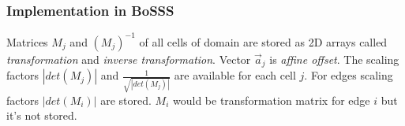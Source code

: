 \documentclass[BoSSSForSolvingConservationLaws.tex]{subfiles}
\begin{document}
\subsubsection*{Implementation in BoSSS}
Matrices $M_j$ and $(M_j)^{-1}$ of all cells of domain are stored as 2D arrays called \emph{transformation} and \emph{inverse transformation}. Vector $\vec{a}_j$ is \emph{affine offset}. The scaling factors $|det(M_j)|$ and $\frac{1}{\sqrt{|det(M_j)|}}$ are available for each cell $j$. For edges scaling factors $|det(M_i)|$ are stored. $M_i$ would be transformation matrix for edge $i$ but it's not stored.
\end{document}
